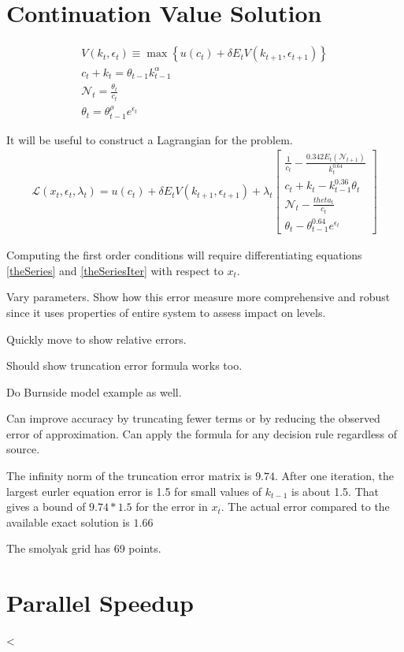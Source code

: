 \documentclass[12pt]{article}
\begin{document}
\section{Continuation Value Solution}

 \begin{gather*}
 V(k_t,\epsilon_t) \equiv  \max\left \{  u(c_t) + \delta E_t V(k_{t+1},\epsilon_{t+1})\right \}\\
c_t + k_t=\theta_{t-1}k_{t-1}^\alpha \\
\mathcal{N}_t=\frac{\theta_t}{c_t}\nonumber\\
 \theta_t =\theta_{t-1}^\rho e^{\epsilon_t}\nonumber
\end{gather*}

It will be useful to construct a Lagrangian for the problem.
\begin{gather*}
  \mathcal{L}(x_t,\epsilon_t,\lambda_t)=u(c_t)+\delta E_t V(k_{t+1},\epsilon_{t+1}) + \lambda_t  \begin{bmatrix}
\frac{1}{c_t} - \frac{0.342 E_t(\mathcal{N}_{t+1})}{k_t^{0.64}}\\
c_t + k_t - k_{t-1}^{0.36}\theta_t\\
\mathcal{N}_t - \frac{theta_t}{c_t}\\
 \theta_t -\theta_{t-1}^{0.64} e^{\epsilon_t}
  \end{bmatrix}
\end{gather*}

Computing the first order conditions will require differentiating equations
\ref{theSeries} and \ref{theSeriesIter} with respect to $x_t$.


Vary parameters.  Show how this error measure more comprehensive and robust
since it uses properties of entire system to assess impact on levels.

Quickly move to show relative errors.

Should show truncation error formula works too.

Do Burnside model example as well.

Can improve accuracy by truncating fewer terms or by reducing the observed 
error of approximation.  Can apply the formula for any decision rule regardless of source.

The infinity norm of the truncation error matrix is $9.74$.  After one iteration, the largest eurler equation error is 1.5 for small values of $k_{t-1}$ is about 1.5.  That gives a bound of $9.74*1.5$ for the error in $x_t$.  The actual error compared to the available exact solution is  $1.66$

The smolyak grid has 69 points.

\section{Parallel Speedup}
\label{sec:parallel-speedup}





  
<
\end{document}
